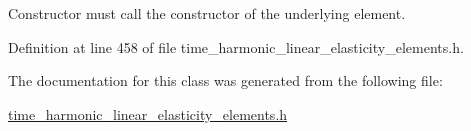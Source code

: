 Constructor must call the constructor of the underlying element. 



Definition at line 458 of file time\+\_\+harmonic\+\_\+linear\+\_\+elasticity\+\_\+elements.\+h.



The documentation for this class was generated from the following file\+:\begin{DoxyCompactItemize}
\item 
\hyperlink{time__harmonic__linear__elasticity__elements_8h}{time\+\_\+harmonic\+\_\+linear\+\_\+elasticity\+\_\+elements.\+h}\end{DoxyCompactItemize}
